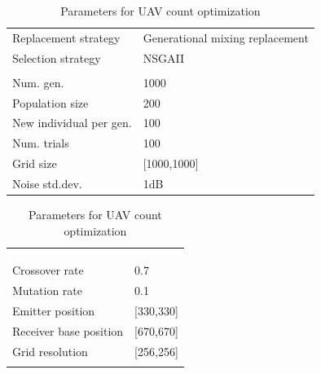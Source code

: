 \documentclass[10pt,a4paper]{book}
\begin{document}
\begin{table}[H]
\centering
\caption{Parameters for \gls{UAV} count optimization}
\begin{minipage}{60mm}
\small
\begin{tabular}{l l}
Replacement strategy & Generational mixing replacement \\  
Selection strategy &  NSGAII   \\  
& \\
Num. gen. & 1000  \\
Population size & 200   \\  
New individual per gen. & 100  \\
Num. trials & 100  \\
Grid size & [1000,1000] \\
Noise std.dev. & 1dB 

\end{tabular}
\end{minipage}
\centering
\begin{minipage}{60mm}
\small
\begin{tabular}{l l}
& \\
& \\
& \\
Crossover rate & 0.7 \\ 
Mutation rate & 0.1  \\ 
Emitter position & [330,330] \\
Receiver base position & [670,670]\\
Grid resolution & [256,256] \\
&

\end{tabular}

\end{minipage}
\end{table}

\newpage

\begingroup
\makeatletter
\def\@makeschapterhead#1{%
  {\parindent \z@ \raggedright
    \normalfont
    \interlinepenalty\@M
    \Huge \bfseries  #1\par\nobreak
    \vskip 40\p@
  }}
\makeatother
\glsaddall
\printglossary[type=\acronymtype,title={Abbreviations}]
\begingroup
\makeatletter
\def\@makeschapterhead#1{%
  {\parindent \z@ \raggedright
    \normalfont
    \interlinepenalty\@M
    \Huge \bfseries  #1\par\nobreak
    \vskip 40\p@
  }}
\makeatother


\end{document}
